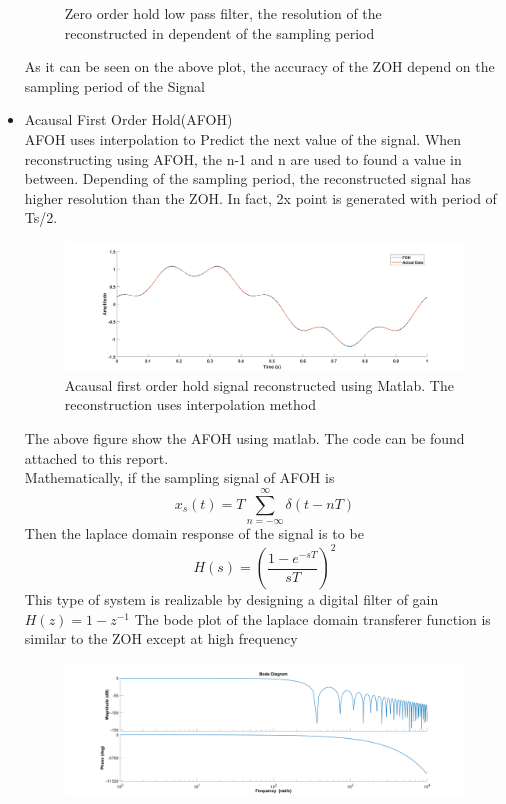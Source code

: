 \documentclass[12pt,letterpaper]{article}
\begin{document}
\begin{itemize}
\begin{figure}[h]
            \caption{Zero order hold low pass filter, the resolution of the 
            reconstructed in dependent of the sampling period}
    \end{figure}
    As it can be seen on the above plot, the accuracy of the ZOH depend 
    on the sampling period of the Signal
    \item Acausal First Order Hold(AFOH)\\
    AFOH uses interpolation to Predict the next value of the signal. When reconstructing using
    AFOH, the n-1 and n are used to found a value in between. Depending of 
    the sampling  period, the reconstructed signal has higher resolution
    than the ZOH. In fact, 2x point is generated with period of Ts/2. 
    \begin{figure}[h]
        \centering
            \includegraphics[width=15cm]{FOH_2_p.jpg}
            \caption{Acausal first order hold signal reconstructed using Matlab. The reconstruction
            uses interpolation method}
    \end{figure}
    The above figure show the AFOH using matlab. The code can be found attached to
    this report.\\
    Mathematically, if the sampling signal of AFOH is 
    \begin{equation}
        x_s(t) =T\sum_{n=-\infty}^{\infty} \delta (t-nT)
    \end{equation}
    Then the laplace domain response of the signal is to be
    \begin{equation}
        H(s)=(\frac{1-e^{-sT}}{sT})^2
    \end{equation}  
    This type of system is realizable by designing a digital filter of gain  
    \(H(z) = 1-z^{-1}\) 
    The bode plot of the laplace domain transferer function is similar to the ZOH except 
    at high frequency
    \begin{figure}[h]
        \centering
            \includegraphics[width=15cm]{bode_FOH.jpg}

\end{figure}
\end{itemize}
\end{document}
